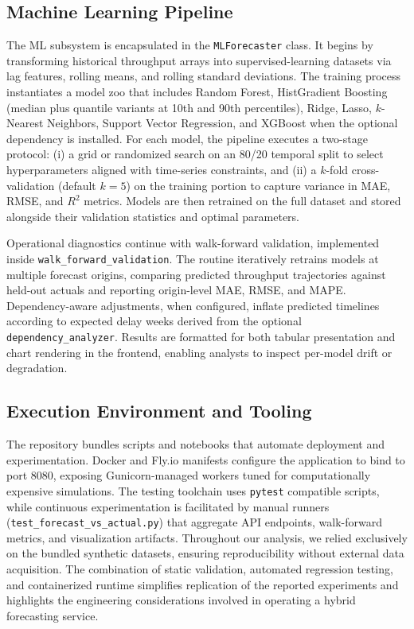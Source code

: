 \subsection{Machine Learning Pipeline}
The ML subsystem is encapsulated in the \texttt{MLForecaster} class. It begins by transforming historical throughput arrays into supervised-learning datasets via lag features, rolling means, and rolling standard deviations. The training process instantiates a model zoo that includes Random Forest, HistGradient Boosting (median plus quantile variants at 10th and 90th percentiles), Ridge, Lasso, $k$-Nearest Neighbors, Support Vector Regression, and XGBoost when the optional dependency is installed. For each model, the pipeline executes a two-stage protocol: (i) a grid or randomized search on an 80/20 temporal split to select hyperparameters aligned with time-series constraints, and (ii) a $k$-fold cross-validation (default $k=5$) on the training portion to capture variance in MAE, RMSE, and $R^2$ metrics. Models are then retrained on the full dataset and stored alongside their validation statistics and optimal parameters.

Operational diagnostics continue with walk-forward validation, implemented inside \texttt{walk\_forward\_validation}. The routine iteratively retrains models at multiple forecast origins, comparing predicted throughput trajectories against held-out actuals and reporting origin-level MAE, RMSE, and MAPE. Dependency-aware adjustments, when configured, inflate predicted timelines according to expected delay weeks derived from the optional \texttt{dependency\_analyzer}. Results are formatted for both tabular presentation and chart rendering in the frontend, enabling analysts to inspect per-model drift or degradation.

\subsection{Execution Environment and Tooling}
The repository bundles scripts and notebooks that automate deployment and experimentation. Docker and Fly.io manifests configure the application to bind to port 8080, exposing Gunicorn-managed workers tuned for computationally expensive simulations. The testing toolchain uses \texttt{pytest} compatible scripts, while continuous experimentation is facilitated by manual runners (\texttt{test\_forecast\_vs\_actual.py}) that aggregate API endpoints, walk-forward metrics, and visualization artifacts. Throughout our analysis, we relied exclusively on the bundled synthetic datasets, ensuring reproducibility without external data acquisition. The combination of static validation, automated regression testing, and containerized runtime simplifies replication of the reported experiments and highlights the engineering considerations involved in operating a hybrid forecasting service.
